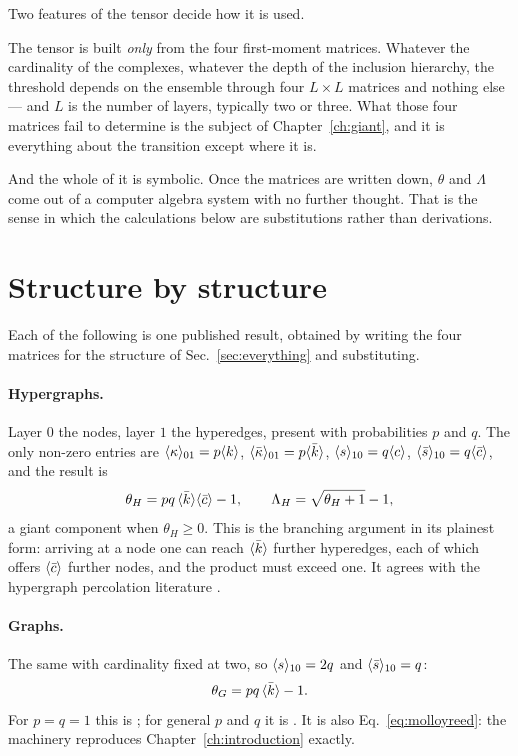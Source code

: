 Two features of the tensor decide how it is used.

The tensor is built \emph{only} from the four first-moment matrices. Whatever
the cardinality of the complexes, whatever the depth of the inclusion hierarchy,
the threshold depends on the ensemble through four $L\times L$ matrices and
nothing else --- and $L$ is the number of layers, typically two or three. What
those four matrices fail to determine is the subject of Chapter~\ref{ch:giant},
and it is everything about the transition except where it is.

And the whole of it is symbolic. Once the matrices are written down, $\theta$
and $\Lambda$ come out of a computer algebra system with no further thought.
That is the sense in which the calculations below are substitutions rather than
derivations.

\section{Structure by structure}
\label{sec:structurebystructure}

Each of the following is one published result, obtained by writing the four
matrices for the structure of Sec.~\ref{sec:everything} and substituting.

\paragraph{Hypergraphs.} Layer $0$ the nodes, layer $1$ the hyperedges, present
with probabilities $p$ and $q$. The only non-zero entries are
$\langle \kappa \rangle_{01}=p\langle k \rangle$, $\langle \bar\kappa \rangle_{01}=p\langle \bar k \rangle$,
$\langle s \rangle_{10}=q\langle c \rangle$, $\langle \bar s \rangle_{10}=q\langle \bar c \rangle$, and the result is
\begin{equation}
  \theta_{H}=pq\,\langle \bar k \rangle\langle \bar c \rangle-1,
  \qquad
  \Lambda_{H}=\sqrt{\theta_{H}+1}-1,
  \label{eq:thetaH}
\end{equation}
a giant component when $\theta_{H}\ge0$. This is the branching argument in its
plainest form: arriving at a node one can reach $\langle \bar k \rangle$ further
hyperedges, each of which offers $\langle \bar c \rangle$ further nodes, and the product
must exceed one. It agrees with the hypergraph percolation literature
\citep{coutinho2020,sun2021,bianconi2023}.

\paragraph{Graphs.} The same with cardinality fixed at two, so
$\langle s \rangle_{10}=2q$ and $\langle \bar s \rangle_{10}=q$:
\begin{equation}
  \theta_{G}=pq\,\langle \bar k \rangle-1.
  \label{eq:thetaG}
\end{equation}
For $p=q=1$ this is \citet{molloy1995}; for general $p$ and $q$
it is \citet{callaway2000}. It is also
Eq.~\eqref{eq:molloyreed}: the machinery reproduces
Chapter~\ref{ch:introduction} exactly.

